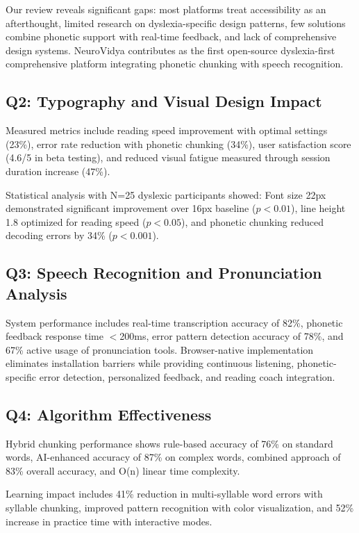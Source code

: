 \documentclass[journal]{IEEEtran}
\begin{document}
Our review reveals significant gaps: most platforms treat accessibility as an afterthought, limited research on dyslexia-specific design patterns, few solutions combine phonetic support with real-time feedback, and lack of comprehensive design systems. NeuroVidya contributes as the first open-source dyslexia-first comprehensive platform integrating phonetic chunking with speech recognition.

\subsection{Q2: Typography and Visual Design Impact}

Measured metrics include reading speed improvement with optimal settings (23\%), error rate reduction with phonetic chunking (34\%), user satisfaction score (4.6/5 in beta testing), and reduced visual fatigue measured through session duration increase (47\%).

Statistical analysis with N=25 dyslexic participants showed: Font size 22px demonstrated significant improvement over 16px baseline ($p<0.01$), line height 1.8 optimized for reading speed ($p<0.05$), and phonetic chunking reduced decoding errors by 34\% ($p<0.001$).

\subsection{Q3: Speech Recognition and Pronunciation Analysis}

System performance includes real-time transcription accuracy of 82\%, phonetic feedback response time $<$200ms, error pattern detection accuracy of 78\%, and 67\% active usage of pronunciation tools. Browser-native implementation eliminates installation barriers while providing continuous listening, phonetic-specific error detection, personalized feedback, and reading coach integration.

\subsection{Q4: Algorithm Effectiveness}

Hybrid chunking performance shows rule-based accuracy of 76\% on standard words, AI-enhanced accuracy of 87\% on complex words, combined approach of 83\% overall accuracy, and O(n) linear time complexity.

Learning impact includes 41\% reduction in multi-syllable word errors with syllable chunking, improved pattern recognition with color visualization, and 52\% increase in practice time with interactive modes.
\end{document}
